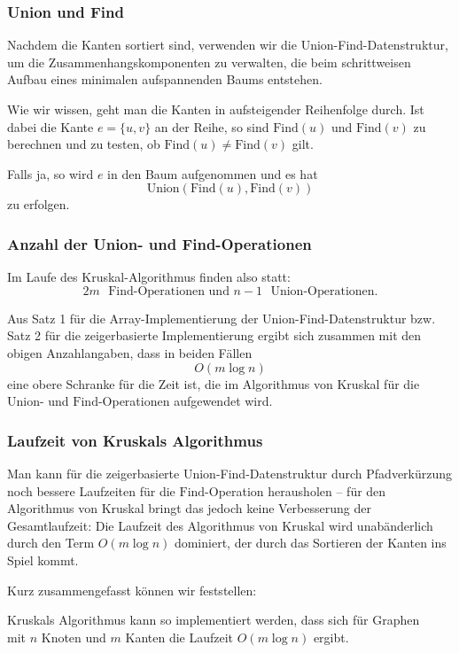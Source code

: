 \documentclass[smaller,xcolor=dvipsnames]{beamer}
\newcommand{\opfind}{\text{Find}}
\newcommand{\opunion}{\text{Union}}
\begin{document}
\begin{frame}
\frametitle{Union und Find}
Nachdem die Kanten sortiert sind, verwenden wir die Union-Find-Datenstruktur, \alert{um die Zusammenhangskomponenten zu verwalten}, die beim schrittweisen Aufbau eines minimalen aufspannenden Baums entstehen. \\ \medskip

Wie wir wissen, geht man die Kanten in aufsteigender Reihenfolge durch. Ist dabei die Kante $e = \{ u,v \}$ an der Reihe, so sind $\opfind{(u)}$ und $\opfind{(v)}$ zu berechnen und zu testen, ob $\opfind{(u)} \neq \opfind{(v)}$ gilt. \\ \medskip

Falls ja, so wird $e$ in den Baum aufgenommen und es hat
\[
\opunion{(\opfind{(u)}, \opfind{(v)})}
\]
zu erfolgen.
\end{frame}

\begin{frame}
\frametitle{Anzahl der Union- und Find-Operationen}
Im Laufe des Kruskal-Algorithmus finden also statt:
\begin{equation*}
\text{$2m$ $\opfind$-Operationen und $n-1$ $\opunion$-Operationen.}
\end{equation*}

Aus Satz 1 für die Array-Implementierung der Union-Find-Datenstruktur bzw. Satz 2 für die zeigerbasierte Implementierung ergibt sich zusammen mit den obigen Anzahlangaben, dass in beiden Fällen
\[
O(m \log n)
\]
eine obere Schranke für die Zeit ist, die im Algorithmus von Kruskal für die $\opunion$- und $\opfind$-Operationen aufgewendet wird.

\end{frame}

\begin{frame}
\frametitle{Laufzeit von Kruskals Algorithmus}
Man kann für die zeigerbasierte Union-Find-Datenstruktur durch Pfadverkürzung noch bessere Laufzeiten für die $\opfind$-Operation herausholen -- für den Algorithmus von Kruskal bringt das jedoch keine Verbesserung der Gesamtlaufzeit: Die Laufzeit des Algorithmus von Kruskal wird unabänderlich durch den Term $O(m \log n)$ dominiert, der durch das Sortieren der Kanten ins Spiel kommt. \\ \medskip

Kurz zusammengefasst können wir feststellen: \\ \medskip

\begin{center}
	\alert{Kruskals Algorithmus kann so implementiert werden, dass sich für Graphen \\ mit $n$ Knoten und $m$ Kanten die Laufzeit $O(m \log n)$ ergibt.}
\end{center}
\end{frame}
\end{document}
